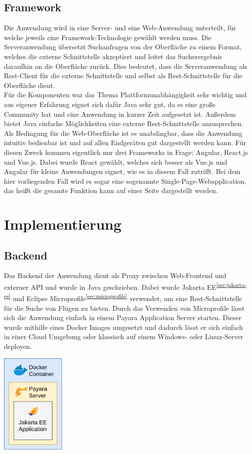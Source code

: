 \documentclass[12pt,twoside,a4paper]{article}
\begin{document}
\subsection{Framework}
Die Anwendung wird in eine Server- und eine Web-Anwendung unterteilt, für welche jeweils eine Framework-Technologie gewählt werden muss. Die Serveranwendung übersetzt Suchanfragen von der Oberfläche zu einem Format, welches die externe Schnittstelle akzeptiert und leitet das Sucherergebnis daraufhin an die Oberfläche zurück. Dies bedeutet, dass die Serveranwendung als Rest-Client für die externe Schnittstelle und selbst als Rest-Schnittstelle für die Oberfläche dient.\\
Für die Komponenten war das Thema Plattformunabhängigkeit sehr wichtig und aus eigener Erfahrung eignet sich dafür Java sehr gut, da es eine große Community hat und eine Anwendung in kurzer Zeit aufgesetzt ist. Außerdem bietet Java einfache Möglichkeiten eine externe Rest-Schnittstelle anzusprechen.\\
Als Bedingung für die Web-Oberfläche ist es unabdingbar, dass die Anwendung intuitiv bedienbar ist und auf allen Endgeräten gut dargestellt werden kann. Für diesen Zweck kommen eigentlich nur drei Frameworks in Frage: Angular, React.js und Vue.js. Dabei wurde React gewählt, welches sich besser als Vue.js und Angular für kleine Anwendungen eignet, wie es in diesem Fall zutrifft. Bei dem hier vorliegenden Fall wird es sogar eine sogenannte Single-Page-Webapplication, das heißt die gesamte Funktion kann auf einer Seite dargestellt werden.
\section{Implementierung}
\subsection{Backend}
Das Backend der Anwendung dient als Proxy zwischen Web-Frontend und externer API und wurde in Java geschrieben. Dabei wurde Jakarta EE\textsuperscript{\ref{sec:jakarta-ee}} und Eclipse Microprofile\textsuperscript{\ref{sec:microprofile}} verwendet, um eine Rest-Schnittstelle für die Suche von Flügen zu bieten. Durch das Verwenden von Microprofile lässt sich die Anwendung einfach in einem Payara Application Server starten. Dieser wurde mithilfe eines Docker Images umgesetzt und dadurch lässt er sich einfach in einer Cloud Umgebung oder klassisch auf einem Windows- oder Linux-Server deployen.
\begin{center}
	\captionsetup{type=figure}
	\includegraphics[height=5cm]{images/backend-structure}
\end{center}
\end{document}
